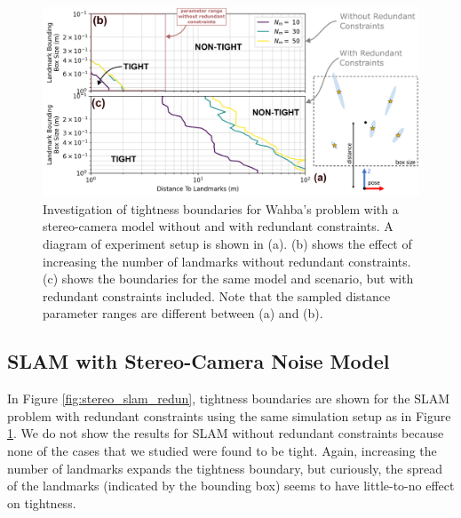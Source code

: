 \documentclass[lettersize,journal]{IEEEtran}
\begin{document}
\begin{figure}[!t]
	\centering
	\includegraphics[width=\columnwidth]{figs/stereo_redun_study}
	\caption{Investigation of tightness boundaries for Wahba's problem with a stereo-camera model without and with redundant constraints. A diagram of experiment setup is shown in (a). (b) shows the effect of increasing the number of landmarks without redundant constraints. (c) shows the boundaries for the same model and scenario, but with redundant constraints included. Note that the sampled distance parameter ranges are different between (a) and (b).}
	\label{fig:stereo_redun}
\end{figure}

\subsection{SLAM with Stereo-Camera Noise Model}\label{sec:SimStereoSLAM}

In Figure \ref{fig:stereo_slam_redun}, tightness boundaries are shown for the SLAM problem with redundant constraints using the same simulation setup as in Figure \ref{fig:stereo_redun}. We do not show the results for SLAM without redundant constraints because none of the cases that we studied were found to be tight. Again, increasing the number of landmarks expands the tightness boundary, but curiously, the spread of the landmarks (indicated by the bounding box) seems to have little-to-no effect on tightness.
\end{document}
